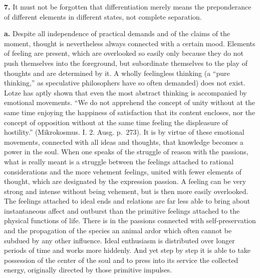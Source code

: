 \documentclass[12pt,a4paper]{book}
\newcommand{\opage}[1]{\marginnote{\footnotesize\textit{[#1]}}}
\begin{document}
\textbf{7.} It must not be forgotten that differentiation merely means the
preponderance of different elements in different states, not complete
separation.

\textbf{a.} Despite all independence of practical demands and of the
claims of the moment, thought is nevertheless always connected with a
certain mood. Elements of feeling are present, which are overlooked so
easily only because they do not push themselves into the foreground, but
subordinate themselves to the play of thoughts and are determined by it.
A wholly feelingless thinking (a ``pure thinking,'' as speculative
philosophers have so often demanded) does not exist. Lotze has aptly
shown that even the most abstract thinking is accompanied by emotional
movements. ``We do not apprehend the concept of unity without at the same
time enjoying the happiness of satisfaction that its content encloses,
nor the concept of opposition without at the same time feeling the
displeasure of hostility.'' (Mikrokosmus. I. 2. Ausg. p.~273). It is by
virtue of these emotional movements, connected with all ideas and
thoughts, that knowledge becomes a power in the soul. When one speaks of
the struggle of reason with the passions, what is really meant is a
struggle between the feelings attached to rational considerations and the
more vehement feelings, united with fewer elements of thought, which are
designated by the expression passion. A feeling can be very strong and
intense without being vehement, but is then more easily overlooked. The
feelings attached to ideal ends and relations are far less able to bring
about instantaneous affect and outburst than the primitive feelings
attached to the physical functions of life. There is in the passions
connected with self-preservation and the propagation of the species an
animal ardor which often cannot be subdued by any other influence. Ideal
enthusiasm is distributed over longer periods of time and works more
hiddenly. And yet step by step it is able to take possession of the
center of the soul and to press into its service the
\opage{113}collected energy, originally directed by those primitive
impulses.
\end{document}
